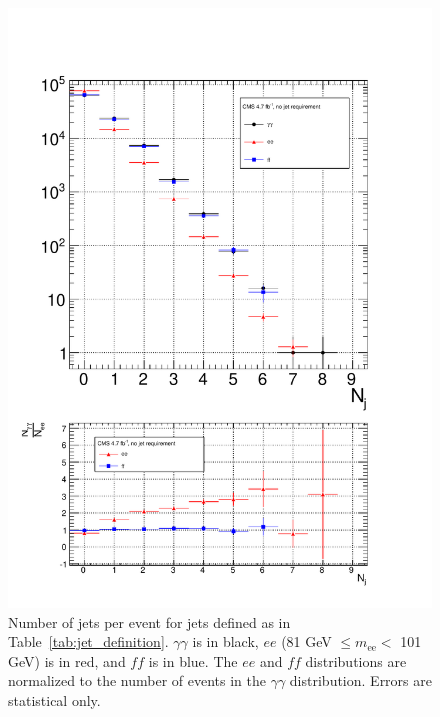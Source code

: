 \documentclass[dissertation_bw.tex]{subfiles}
\begin{document}
\begin{figure}
	\centering
	\includegraphics[scale=0.5]{hadronic_activity_Nj}
	\caption{Number of jets per event for jets defined as in Table~\ref{tab:jet_definition}.  $\gamma\gamma$ is in black, $ee$ (81 GeV $\leq m_{\mathrm{ee}} <$ 101 GeV) is in red, and $\mathit{ff}$ is in blue.  The $ee$ and $\mathit{ff}$ distributions are normalized to the number of events in the $\gamma\gamma$ distribution.  Errors are statistical only.}
	\label{fig:hadronic_activity_Nj}
\end{figure}
\end{document}
